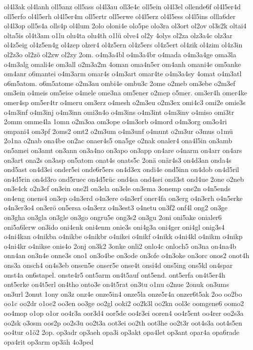 {ol4l3ak
ol4lanh
oll5anz
oll5ass
ol4l3au
oll3e4c
oll5ein
ol4l3el
ollende6f
ol4l5er4d
oll5erfo
ol4l5erh
ol4l5er4m
oll5ertr
oll5erwe
ol4l5erz
ol4l5ess
ol4l5ins
ollla6der
ol4l3op
oll5s4a
olls4p
ol4lum
2olo
oloni4e
olo5pe
olo3ra
ol3ort
ol2ov
ol3s2k
oltai4
olta5is
ol4t3am
o1lu
olu4ta
olu4th
o1lü
olve4
ol2y
4olys
ol2za
olz3a4c
olz3ar
ol4z5eig
ol4z5en4g
ol4zep
olzer4
ol4z5ern
ol4z5ers
ol4z5ert
ol4zik
ol4zim
ol4z3in
ol2z3o
ol2zö
ol2zw
ol2zy
2om.
o4m3a4bl
o4m3a4br
o4mada
o4m3a4ge
oma3la
o4m3alg
omali4e
om3all
o2m3a2m
4oman
oma4n5er
om4anh
omani4e
om5anke
om4anr
o6mantei
o4m3arm
omar4s
o4m3art
omar4te
o4m3a4sy
4omat
o4m3atl
o6m5atom.
o6m5atome
o2m3au
ombi4e
ombu3c
2ome
o2meb
om3ebe
o2m3ef
om3ein
o4meis
om5eise
o4mele
ome3na
om5ener
o2mep
o5mer.
om3er4h
omer4ke
omer4sp
om5er4tr
o4meru
om3erz
o4mesh
o2m3eu
o2m3ex
omi4c3
omi2e
omie3s
o4m3inf
o4m3inj
o4m3inn
omi3n4o
o4m3ins
o4m3int
o4m3inv
o4miso
omi3tr
2omm
omme4la
1omn
o2m3oa
om3ope
o4m3orb
o4mord
o4m3org
om3o4ri
ompani4
om3pf
2oms2
omt2
o2m3um
o4m3unf
o4munt
o2m3ur
o3mus
o1mü
2o1na
o2nab
ona4be
on2ac
onaer4s5
ona5ge
o2nak
onaler4
ona4l5in
on3amb
on5amei
on3amt
on3ann
on3a4no
on3apo
on3app
on4are
o4narm
on4arr
on4ars
on3art
ona2s
on3asp
on5atom
onat4s
onats5c
2onä
onär4s3
on4d3an
onda4s
ond5ast
on4d3ei
onder5ei
onde6r5ers
on4d3ex
ondi4e
ond5inn
on4dob
on4d5ril
on4d5rin
on4d3ro
ond5ruec
on4d5rüc
ond4sa
ond4sei
ond3st
ond4ue
2one
o2neb
on3e4ck
o2n3ef
on3ein
one2l
on3ela
on3ele
on3ema
3onemp
one2n
o4n5ends
on4eng
onens4
on3ep
o4n3erd
o4n3ere
o4n3erf
oner4fa
on3erg
o4n3erh
o4n5erke
o4n3er3o4
on3erö
on5ersa
o4n3erz
o4n3est3
o4netu
on3f2
onf4l
ong2
on3ge
on3gha
on3gla
on3gle
on3go
ongru5e
ong3s2
on3gu
2oni
oni5ake
onialer6
oni5a6lerw
on3ido
oni4enk
oni4enm
onie3s
oni4g3a
oni4ger
oni4gl
onig3s4
o4ni4kan
o4nikba
o4nikbe
o4nikbr
o4nikei
o4nikf
o4nikk
o4ni4kl
o4nikm
o4nikp
o4ni4kr
o4nikse
onis4o
2onj
on3k2
3onke
onli2
onlo4c
onloch5
on3na
on4na4b
onn4an
on3n4e
onne3s
ono1
on3o4be
on3ode
on3ofe
o4n3oke
on3orc
onos2
onot4h
ons3a
onsch4
on4s3eb
onsen5e
onser5e
onse4t
onsi4d
ons5ing
ons5kl
on4spar
onst4a
on6stapel.
onste4r5
ont5arm
on4t5auf
ont5end.
ont5erfa
on4t5er4h
ont5erke
on4t5erl
on4tho
onto3e
on4t5rat
on3tu
o1nu
o2nue
2onuk
on3ums
on3url
2onut
1ony
on3z
onz4e
onze5in4
onze5la
onze5r4a
onzer6t5ak
2oo
oo2bo
oo1c
oo2dr
o1oe2
oo3en
oo3ge
oo2gl
ooki2
oo2k3l
oo2kn
ool3c
oomgene6
oomo2
oo4mop
o1op
o1or
oo4r3a
oor3d4
oor5de
oo4r3ei
ooren4
oo4r5ent
oo4rer
oo2s3a
oo2sk
o3osm
oos2p
oo2s3u
oo2t3a
oot3ei
oo2th
oot3he
oo2t3r
oot4s3a
oot4s5en
oo4tur
o1ö2
2op.
op3adr
op3aeh
opa3i
op3akt
opa4let
op3ant
opar4a
opa6rade
opa4rit
op3arm
op3äh
4o3ped
}
